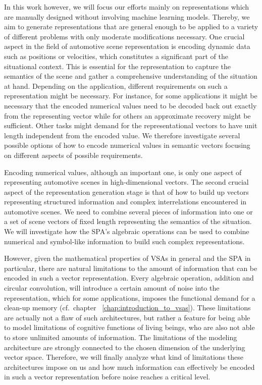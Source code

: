 In this work however, we will focus our efforts mainly on representations which are manually designed without involving machine learning models.
Thereby, we aim to generate representations that are general enough to be applied to a variety of different problems with only moderate modifications necessary.
One crucial aspect in the field of automotive scene representation is encoding dynamic data such as positions or velocities, which constitutes a significant part of the situational context.
This is essential for the representation to capture the semantics of the scene and gather a comprehensive understanding of the situation at hand.
Depending on the application, different requirements on such a representation might be necessary.
For instance, for some applications it might be necessary that the encoded numerical values need to be decoded back out exactly from the representing vector while for others an approximate recovery might be sufficient.
Other tasks might demand for the representational vectors to have unit length independent from the encoded value.
We therefore investigate several possible options of how to encode numerical values in semantic vectors focusing on different aspects of possible requirements.

Encoding numerical values, although an important one, is only one aspect of representing automotive scenes in high-dimensional vectors.
The second crucial aspect of the representation generation stage is that of how to build up vectors representing structured information and complex interrelations encountered in automotive scenes.
We need to combine several pieces of information into one or a set of scene vectors of fixed length representing the semantics of the situation.
We will investigate how the \ac{SPA}'s algebraic operations can be used to combine numerical and symbol-like information to build such complex representations.

However, given the mathematical properties of \acp{VSA} in general and the \ac{SPA} in particular, there are natural limitations to the amount of information that can be encoded in such a vector representation.
Every algebraic operation, addition and circular convolution, will introduce a certain amount of noise into the representation, which for some applications, imposes the functional demand for a clean-up memory (cf.\ chapter ~\ref{chap:introduction_to_vsas}).
These limitations are actually not a flaw of such architectures, but rather a feature for being able to model limitations of cognitive functions of living beings, who are also not able to store unlimited amounts of information.
The limitations of the modeling architecture are strongly connected to the chosen dimension of the underlying vector space.
Therefore, we will finally analyze what kind of limitations these architectures impose on us and how much information can effectively be encoded in such a vector representation before noise reaches a critical level.

